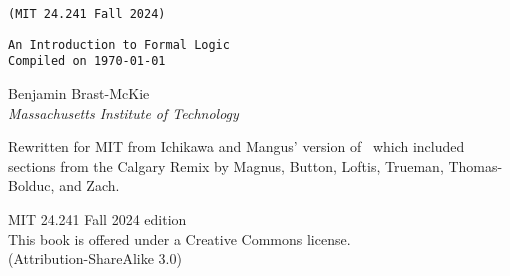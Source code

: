 
\thispagestyle{empty}
{\Huge\forallx} \hfill {\LARGE \texttt{(MIT 24.241 Fall 2024)}} %

{\tt An Introduction to Formal Logic\\
Compiled on \today}

\vspace{.5in}



{\sf Benjamin Brast-McKie}\\
\emph{Massachusetts Institute of Technology}




{\sf Rewritten for MIT from Ichikawa and Mangus' version of \forallx\ which included sections from the Calgary Remix by Magnus, Button, Loftis, Trueman, Thomas-Bolduc, and Zach.}





\vfill




{\sf
	MIT 24.241 Fall 2024 edition \\%
	This book is offered under a Creative Commons license.\\
	(Attribution-ShareAlike 3.0)
}



\newpage
\thispagestyle{empty}%


%


